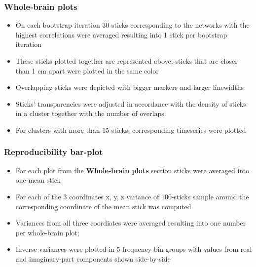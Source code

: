 \documentclass{article}
\begin{document}
\subsubsection{Whole-brain plots}

\begin{itemize}
    \item On each bootstrap iteration 30 sticks corresponding to the networks
          with the highest correlations were averaged resulting into 1 stick per bootstrap iteration
    \item These sticks plotted together are represented above;
          sticks that are closer than 1 cm apart were plotted in the same color
    \item Overlapping sticks were depicted with bigger markers and larger linewidths
    \item Sticks' transparencies were adjusted in accordance with the density of sticks in
          a cluster together with the number of overlaps.
    \item For clusters with more than 15 sticks, corresponding timeseries were plotted
\end{itemize}

\subsubsection{Reproducibility bar-plot}

\begin{itemize}
    \item For each plot from the \textbf{Whole-brain plots} section sticks were
          averaged into one mean stick
    \item For each of the 3 coordinates x, y, z variance of 100-sticks sample
          around the corresponding coordinate of the mean stick was computed
    \item Variances from all three coordiates were averaged resulting into one
          number per whole-brain plot;
    \item Inverse-variances were plotted in 5 frequency-bin groups with
          values from real and imaginary-part components shown side-by-side
\end{itemize}

\end{document}
